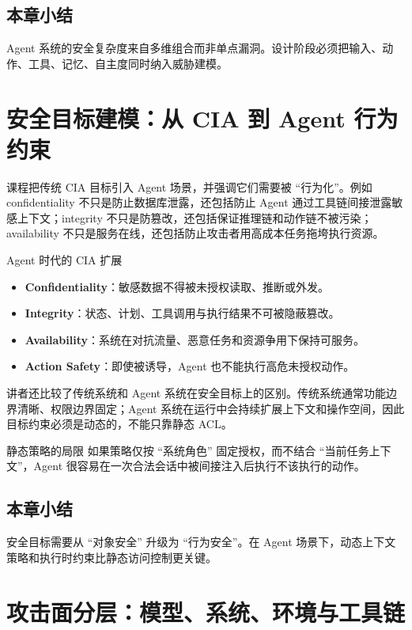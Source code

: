 \documentclass[a4paper]{article}
\begin{document}
\subsection{本章小结}
Agent 系统的安全复杂度来自多维组合而非单点漏洞。设计阶段必须把输入、动作、工具、记忆、自主度同时纳入威胁建模。

\section{安全目标建模：从 CIA 到 Agent 行为约束}

课程把传统 CIA 目标引入 Agent 场景，并强调它们需要被 ``行为化''。例如 confidentiality 不只是防止数据库泄露，还包括防止 Agent 通过工具链间接泄露敏感上下文；integrity 不只是防篡改，还包括保证推理链和动作链不被污染；availability 不只是服务在线，还包括防止攻击者用高成本任务拖垮执行资源。

\begin{importantbox}{Agent 时代的 CIA 扩展}
\begin{itemize}
    \item \textbf{Confidentiality}：敏感数据不得被未授权读取、推断或外发。
    \item \textbf{Integrity}：状态、计划、工具调用与执行结果不可被隐蔽篡改。
    \item \textbf{Availability}：系统在对抗流量、恶意任务和资源争用下保持可服务。
    \item \textbf{Action Safety}：即使被诱导，Agent 也不能执行高危未授权动作。
\end{itemize}
\end{importantbox}

讲者还比较了传统系统和 Agent 系统在安全目标上的区别。传统系统通常功能边界清晰、权限边界固定；Agent 系统在运行中会持续扩展上下文和操作空间，因此目标约束必须是动态的，不能只靠静态 ACL。

\begin{warningbox}{静态策略的局限}
如果策略仅按 ``系统角色'' 固定授权，而不结合 ``当前任务上下文''，Agent 很容易在一次合法会话中被间接注入后执行不该执行的动作。
\end{warningbox}

\subsection{本章小结}
安全目标需要从 ``对象安全'' 升级为 ``行为安全''。在 Agent 场景下，动态上下文策略和执行时约束比静态访问控制更关键。

\section{攻击面分层：模型、系统、环境与工具链}
\end{document}
